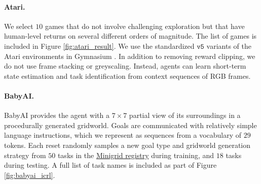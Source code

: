\documentclass{article}
\begin{document}
\paragraph{Atari.} We select $10$ games that do not involve challenging exploration but that have human-level returns on several different orders of magnitude. The list of games is included in Figure \ref{fig:atari_result}. We use the standardized $\texttt{v5}$ variants of the Atari environments in Gymnasium \cite{towers_gymnasium_2023}. In addition to removing reward clipping, we do not use frame stacking or greyscaling. Instead, agents can learn short-term state estimation and task identification from context sequences of RGB frames.
\paragraph{BabyAI.} BabyAI provides the agent with a $7 \times 7$ partial view of its surroundings in a procedurally generated gridworld. Goals are communicated with relatively simple language instructions, which we represent as sequences from a vocabulary of $29$ tokens. Each reset randomly samples a new goal type and gridworld generation strategy from $50$ tasks in the \href{https://minigrid.farama.org/environments/babyai/}{Minigrid registry} during training, and $18$ tasks during testing. A full list of task names is included as part of Figure \ref{fig:babyai_icrl}.
\end{document}
